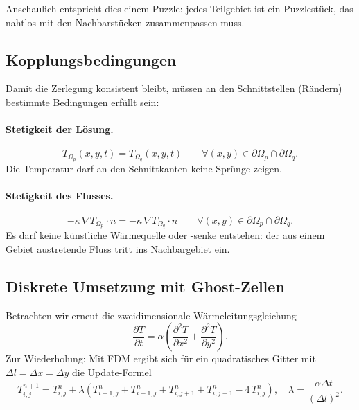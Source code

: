Anschaulich entspricht dies einem Puzzle: 
jedes Teilgebiet ist ein Puzzlestück, das nahtlos mit den Nachbarstücken zusammenpassen muss.

\subsection{Kopplungsbedingungen}
Damit die Zerlegung konsistent bleibt, müssen an den Schnittstellen (Rändern) bestimmte Bedingungen erfüllt sein:

\paragraph{Stetigkeit der Lösung.}
%
\begin{equation}
	T_{\Omega_p}(x,y,t) = T_{\Omega_q}(x,y,t)
	\qquad \forall (x,y) \in \partial \Omega_p \cap \partial \Omega_q.
\end{equation}
Die Temperatur darf an den Schnittkanten keine Sprünge zeigen.

\paragraph{Stetigkeit des Flusses.}
%
\begin{equation}
	- \kappa \, \nabla T_{\Omega_p} \cdot n
	=
	- \kappa \, \nabla T_{\Omega_q} \cdot n
	\qquad \forall (x,y) \in \partial \Omega_p \cap \partial \Omega_q.
\end{equation}
Es darf keine künstliche Wärmequelle oder -senke entstehen: der aus einem Gebiet austretende Fluss tritt ins Nachbargebiet ein.

\subsection{Diskrete Umsetzung mit Ghost-Zellen}
Betrachten wir erneut die zweidimensionale Wärmeleitungsgleichung
\begin{equation}
	\frac{\partial T}{\partial t} = 
	\alpha \left(
	\frac{\partial^2 T}{\partial x^2} + \frac{\partial^2 T}{\partial y^2}
	\right).
\end{equation}
Zur Wiederholung: Mit FDM ergibt sich für ein quadratisches Gitter mit $\Delta l=\Delta x=\Delta y$ die Update-Formel
\begin{equation}
	T_{i,j}^{n+1}
	=
	T_{i,j}^{n}
	+
	\lambda \left(
	T_{i+1,j}^{n}+T_{i-1,j}^{n}+T_{i,j+1}^{n}+T_{i,j-1}^{n}-4\,T_{i,j}^{n}
	\right),
	\quad
	\lambda=\frac{\alpha\Delta t}{(\Delta l)^2}.
	\label{eq:update-dd}
\end{equation}


